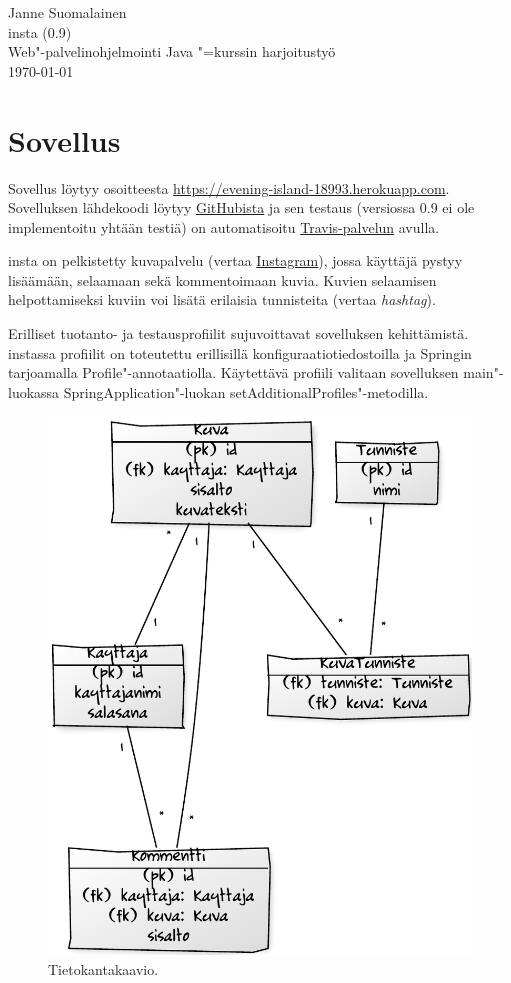 \documentclass[finnish,colorlinks,headings=normal,parskip=half,footsepline]{scrartcl}
\begin{document}
Janne Suomalainen\\\textsf{insta} (0.9)\\Web"-palvelinohjelmointi Java "=kurssin harjoitustyö\\\today

\section{Sovellus}
Sovellus löytyy osoitteesta \url{https://evening-island-18993.herokuapp.com}. Sovelluksen lähdekoodi löytyy \href{https://github.com/suomja1/insta}{GitHubista} ja sen testaus (versiossa 0.9 ei ole implementoitu yhtään testiä) on automatisoitu \href{https://travis-ci.org/suomja1/insta}{Travis-palvelun} avulla.

\textsf{insta} on pelkistetty kuvapalvelu (vertaa \href{https://www.instagram.com}{Instagram}), jossa käyttäjä pystyy lisäämään, selaamaan sekä kommentoimaan kuvia. Kuvien selaamisen helpottamiseksi kuviin voi lisätä erilaisia tunnisteita (vertaa \emph{hashtag}).

Erilliset tuotanto- ja testausprofiilit sujuvoittavat sovelluksen kehittämistä. \textsf{insta}ssa profiilit on toteutettu erillisillä konfiguraatiotiedostoilla ja Springin tarjoamalla Profile"-annotaatiolla. Käytettävä profiili valitaan sovelluksen main"-luokassa SpringApplication"-luokan setAdditionalProfiles"-metodilla.

\begin{figure}
\vspace*{-\intextsep}
\centering\includegraphics[width=\linewidth]{6424b8c7}
\caption{Tietokantakaavio.}\label{fig:tk}
\end{figure}
\end{document}
